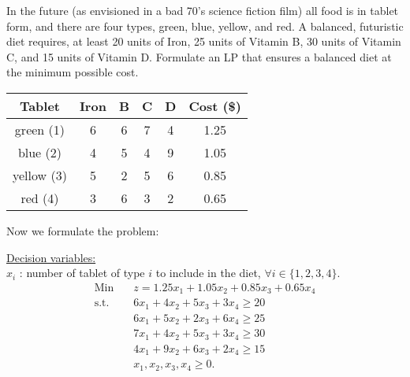  In the future (as envisioned in a bad 70's science fiction film) all food is in tablet form, and there are four types, green, blue, yellow, and red. A balanced, futuristic diet requires, at least 20 units of Iron, 25 units of Vitamin B, 30 units of Vitamin C, and 15 units of Vitamin D. Formulate an LP that ensures a balanced diet at the minimum possible cost.

\begin{table}[h!] \begin{center} \begin{tabular} {|c|c|c|c|c|c|}
\hline Tablet  & Iron &  B &  C  &  D & Cost (\$) \\ \hline
\hline  green (1)  & 6    & 6  & 7          & 4        &  1.25 \\
\hline  blue (2)  & 4    & 5  & 4          & 9        &  1.05 \\
\hline  yellow (3) & 5    & 2  & 5          & 6        &  0.85 \\
\hline  red (4)   & 3    & 6  & 3          & 2        &  0.65 \\ \hline
\end{tabular} \end{center} \end{table}

Now we formulate the problem:

\smallskip  \underline{Decision variables:} \\
$x_i$ : number of tablet of type $i$ to include in the diet, $\forall i \in \{1,2,3,4\}$.
\begin{align*}
\mbox{Min~~ } & z = 1.25x_1 + 1.05x_2 + 0.85x_3 + 0.65x_4 \\
\mbox{s.t.~~} &  6x_1 + 4x_2 + 5x_3 + 3x_4 \ge 20  \\
& 6x_1 + 5x_2 + 2x_3 + 6x_4 \ge 25 \\
& 7x_1 + 4x_2 + 5x_3 + 3x_4 \ge 30 \\
& 4x_1 + 9x_2 + 6x_3 + 2x_4 \ge 15  \\
& x_1, x_2, x_3, x_4 \ge 0. 
\end{align*}



